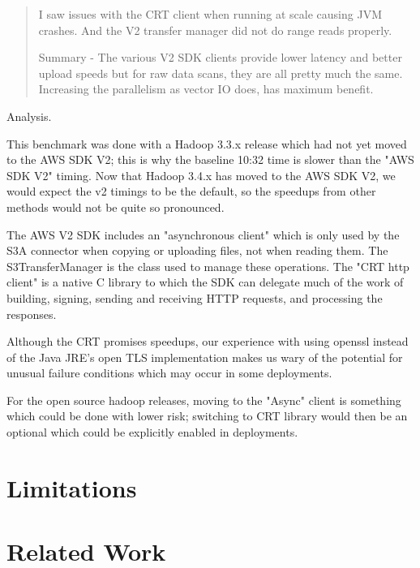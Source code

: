 \documentclass[conference]{IEEEtran}
\begin{document}
\begin{quotation}

I saw issues with the CRT client when running at scale causing JVM crashes.
And the V2 transfer manager did not do range reads properly.

Summary - The various V2 SDK clients provide lower latency and better upload speeds but for raw data scans,
they are all pretty much the same.
Increasing the parallelism as vector IO does, has maximum benefit.
\end{quotation}

Analysis.

This benchmark was done with a Hadoop 3.3.x release which had not yet moved to
the AWS SDK V2; this is why the baseline 10:32 time is slower than the "AWS SDK V2"
timing.
Now that Hadoop 3.4.x has moved to the AWS SDK V2, we would expect the v2 timings to
be the default, so the speedups from other methods would not be quite so pronounced.

The AWS V2 SDK includes an "asynchronous client" which is only used by the S3A
connector when copying or uploading files, not when reading them.
The S3TransferManager is the class used to manage these operations.
The "CRT http client" is a native C library to which the SDK can delegate much
of the work of building, signing, sending and receiving HTTP requests, and processing
the responses.

Although the CRT promises speedups, our experience with using openssl instead of
the Java JRE's open TLS implementation makes us wary of the potential for
unusual failure conditions which may occur in some deployments.

For the open source hadoop releases, moving to the "Async" client is something
which could be done with lower risk; switching to CRT library would then be
an optional which could be explicitly enabled in deployments.


\section{Limitations}
\label{sec:limitations}


\section{Related Work}
\label{sec:related-work}
\end{document}

